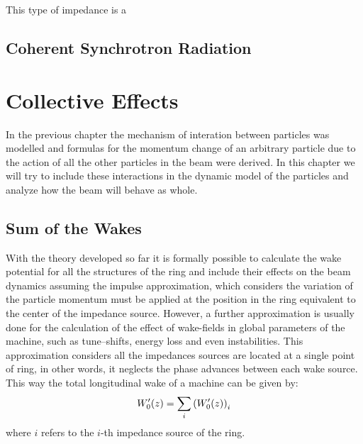     This type of impedance is a

\section{Coherent Synchrotron Radiation}


\chapter{Collective Effects}\label{cap:collective_effects}

    In the previous chapter the mechanism of interation between particles was modelled and formulas for the momentum change of an arbitrary particle due to the action of all the other particles in the beam were derived. In this chapter we will try to include these interactions in the dynamic model of the particles and analyze how the beam will behave as whole.

\section{Sum of the Wakes}\label{sec:sum_of_wakes}

    With the theory developed so far it is formally possible to calculate the wake potential for all the structures of the ring and include their effects on the beam dynamics assuming the impulse approximation, which considers the variation of the particle momentum must be applied at the position in the ring equivalent to the center of the impedance source. However, a further approximation is usually done for the calculation of the effect of wake-fields in global parameters of the machine, such as tune--shifts, energy loss and even instabilities. This approximation considers all the impedances sources are located at a single point of ring, in other words, it neglects the phase advances between each wake source. This way the total longitudinal wake of a machine can be given by:
    \begin{align}\label{eq:scaling_longitudinal}
        W'_0(z) = \sum_i \left(W'_0(z)\right)_i
    \end{align}
    where $i$ refers to the $i$-th impedance source of the ring.

